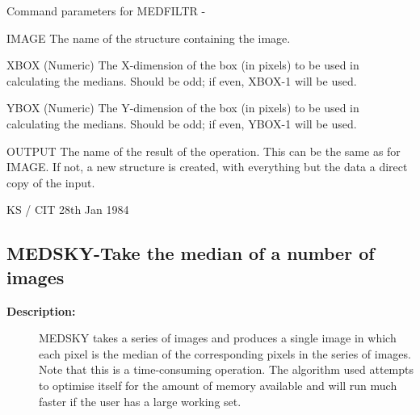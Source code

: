 \begin{description}
\begin{description}
\begin{terminalv}
 Command parameters for MEDFILTR -

 IMAGE    The name of the structure containing the image.

 XBOX     (Numeric) The X-dimension of the box (in pixels) to be
          used in calculating the medians.  Should be odd;
          if even, XBOX-1 will be used.

 YBOX     (Numeric) The Y-dimension of the box (in pixels) to be
          used in calculating the medians.  Should be odd;
          if even, YBOX-1 will be used.

 OUTPUT   The name of the result of the operation.  This can
          be the same as for IMAGE.  If not, a new structure
          is created, with everything but the data a direct
          copy of the input.

                                  KS / CIT 28th Jan 1984
\end{terminalv}
\end{description}
\subsection{MEDSKY-\label{MEDSKY}Take the median of a number of images}
\begin{description}

\item [\textbf{Description:}]
 MEDSKY takes a series of images and produces a single image in
 which each pixel is the median of the corresponding pixels in the
 series of images.   Note that this is a time-consuming operation.
 The algorithm used attempts to optimise itself for the amount of
 memory available and will run much faster if the user has a large
 working set.


\end{description}
\end{description}
